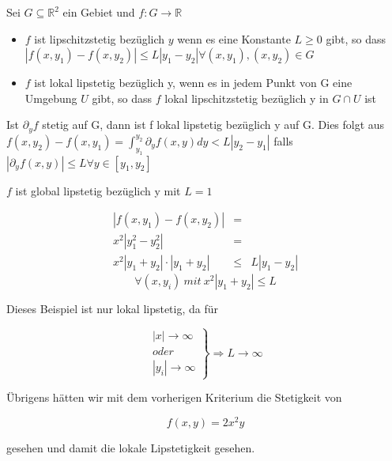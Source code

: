 \documentclass[10pt,a4paper]{article}
\begin{document}
\begin{defi}
Sei $G \subseteq \mathbb{R}^{2}$ ein Gebiet und $f: G \rightarrow \mathbb{R}$
\begin{itemize}
\item $f$ ist lipschitzstetig bezüglich $y$ wenn es eine Konstante $L \geq 0$ gibt, so dass $\left| f(x,y_1)-f(x,y_2) \right| \leq L \left| y_1 - y_2 \right| \forall (x,y_1), (x,y_2) \in G$
\item $f$ ist lokal lipstetig bezüglich y, wenn es in jedem Punkt von G eine Umgebung $U$ gibt, so dass $f$ lokal lipschitzstetig bezüglich y in $G \cap U$ ist
\end{itemize}
\end{defi}

\begin{satz}

Ist $\partial_y f$ stetig auf G, dann ist f lokal lipstetig bezüglich y auf G. Dies folgt aus $f(x,y_2)-f(x,y_1)=\int^{y_2}_{y_1} \partial_y f(x,y)dy < L \left| y_2-y_1\right|$ falls $\left| \partial_y f(x,y) \right| \leq L \forall y \in [y_1,y_2]$
\end{satz}
\begin{bsp}[$f(x,y)=\left| y \right|$]
$f$ ist global lipstetig bezüglich y mit $L=1$
\end{bsp}

\begin{bsp}[$f(x,y)=x+x^{2}y^{2}$]

\begin{eqnarray*}
|f(x,y_1) - f(x,y_2)| &=& \\
x^{2}| y_1^{2} - y_2^{2} | &=& \\
x^{2}| y_1+y_2| \cdot |y_1+y_2| & \leq & L | y_1-y_2|
\end{eqnarray*}
$$\forall (x,y_i) ~mit~  x^{2} \left|y_1+y_2\right| \leq L$$

Dieses Beispiel ist nur lokal lipstetig, da für 

\begin{equation*}
\left. \begin{matrix}
| x| \rightarrow \infty \\
oder \\
| y_i| \rightarrow \infty
\end{matrix}
\right\rbrace \Rightarrow L \rightarrow \infty
\end{equation*}

Übrigens hätten wir mit dem vorherigen Kriterium die Stetigkeit von 

\begin{equation*}
f(x,y) = 2x^{2}y
\end{equation*} 

gesehen und damit die lokale Lipstetigkeit gesehen.

\end{bsp}
\end{document}
